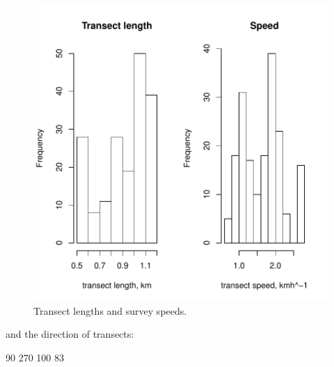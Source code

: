 \documentclass{article}
\begin{document}
\begin{figure}
\begin{center}
\includegraphics{WC86R1-fig1}
\end{center}
\caption{Transect lengths and survey speeds.}
\label{fig:one}
\end{figure}

and the direction of transects:
\begin{Schunk}
\begin{Soutput}
 90 270 
100  83 
\end{Soutput}
\end{Schunk}
\end{document}

